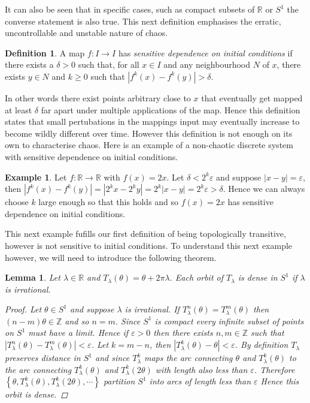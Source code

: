 \documentclass[11pt,a4paper,oneside]{memoir}
\theoremstyle{plain}
\newtheorem{lem}[thm]{Lemma}
\theoremstyle{definition}
\newtheorem{defn}[thm]{Definition}
\newtheorem{exmp}[thm]{Example}
\begin{document}
It can also be seen that in specific cases, such as compact subsets of $\mathbb{R}$ or $S^1$ the converse statement is also true. This next definition emphasises the erratic, uncontrollable and unstable nature of chaos.

\begin{defn}
    A map $f: I \to I$ has \emph{sensitive dependence on initial conditions} if there exists a $\delta > 0$ such that, for all $x \in I$ and any neighbourhood $N$ of $x$, there exists $y \in N$ and $k \geq 0$ such that $\left\lvert f^k(x) - f^k(y) \right\rvert > \delta$.
\end{defn}

In other words there exist points arbitrary close to $x$ that eventually get mapped at least $\delta$ far apart under multiple applications of the map. Hence this definition states that small pertubations in the mappings input may eventually increase to become wildly different over time. However this definition is not enough on its own to characterise chaos. Here is an example of a non-chaotic discrete system with sensitive dependence on initial conditions.

\begin{exmp} \label{exmp:2x}
    Let $f: \mathbb{R} \to \mathbb{R}$ with $f(x) = 2x$. Let $\delta < 2^k \varepsilon$ and suppose $|x - y| = \varepsilon$, then $\left\lvert f^k(x) - f^k(y) \right\rvert = \left\lvert 2^k x - 2^k y \right\rvert = 2^k \left\lvert x - y \right\rvert = 2^k \varepsilon > \delta$. Hence we can always choose $k$ large enough so that this holds and so $f(x) = 2x$ has sensitive dependence on initial conditions.
\end{exmp}

This next example fufills our first definition of being topologically transitive, however is not sensitive to initial conditions. To understand this next example however, we will need to introduce the following theorem.

\begin{lem} \label{thm:s1irrational}
    Let $\lambda \in \mathbb{R}$ and $T_\lambda(\theta) = \theta + 2\pi \lambda$. Each orbit of $T_\lambda$ is dense in $S^1$ if $\lambda$ is irrational.
    \begin{proof}
        Let $\theta \in S^1$ and suppose $\lambda$ is irrational. If $T_\lambda^n(\theta) = T_\lambda^m(\theta)$ then $(n - m)\theta \in \mathbb{Z}$ and so $n = m$. Since $S^1$ is compact every infinite subset of points on $S^1$ must have a limit. Hence if $\varepsilon > 0$ then there exists $n, m \in \mathbb{Z}$ such that $\left\lvert T_\lambda^n(\theta) - T_\lambda^m(\theta) \right\rvert < \varepsilon$. Let $k = m - n$, then $\left\lvert T_\lambda^k(\theta) - \theta \right\rvert < \varepsilon$. By definition $T_\lambda$ preserves distance in $S^1$ and since $T_\lambda^k$ maps the arc connecting $\theta$ and $T_\lambda^k(\theta)$ to the arc connecting $T_\lambda^k(\theta)$ and $T_\lambda^k(2 \theta)$ with length also less than $\varepsilon$. Therefore $\left\lbrace \theta, T_\lambda^k(\theta), T_\lambda^k(2 \theta), \cdots \right\rbrace$ partition $S^1$ into arcs of length less than $\varepsilon$ Hence this orbit is dense.
    \end{proof}
\end{lem}
\end{document}
